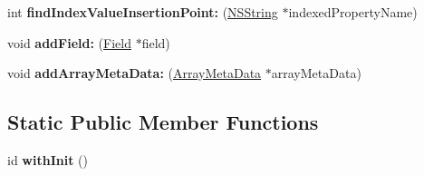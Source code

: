 \begin{DoxyCompactItemize}
\item 
\hypertarget{interface_mobile_object_a4ebefdcabafadee90025cdfce0728c4c}{
int {\bfseries find\-Index\-Value\-Insertion\-Point\-:} (\hyperlink{class_n_s_string}{\-N\-S\-String} $\ast$indexed\-Property\-Name)}
\label{interface_mobile_object_a4ebefdcabafadee90025cdfce0728c4c}

\item 
\hypertarget{interface_mobile_object_a55fff87adc8588d1def2659211aff32d}{
void {\bfseries add\-Field\-:} (\hyperlink{interface_field}{\-Field} $\ast$field)}
\label{interface_mobile_object_a55fff87adc8588d1def2659211aff32d}

\item 
\hypertarget{interface_mobile_object_a78113fbe14eae0cc25795b8b9365116e}{
void {\bfseries add\-Array\-Meta\-Data\-:} (\hyperlink{interface_array_meta_data}{\-Array\-Meta\-Data} $\ast$array\-Meta\-Data)}
\label{interface_mobile_object_a78113fbe14eae0cc25795b8b9365116e}

\end{DoxyCompactItemize}
\subsection*{\-Static \-Public \-Member \-Functions}
\begin{DoxyCompactItemize}
\item 
\hypertarget{interface_mobile_object_a434d78bff82165d12b8f7451236a7d39}{
id {\bfseries with\-Init} ()}
\label{interface_mobile_object_a434d78bff82165d12b8f7451236a7d39}

\end{DoxyCompactItemize}
